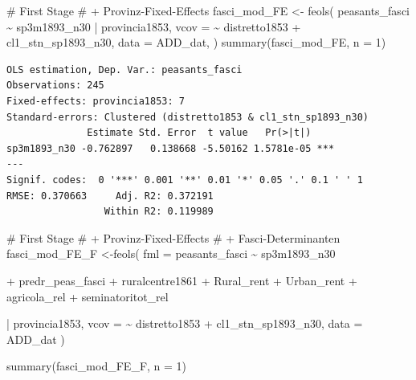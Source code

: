 \documentclass[
  a4paper,
  DIV=11,
  oneside]{scrreprt}
\newenvironment{Shaded}{\begin{snugshade}}{\end{snugshade}}
\newcommand{\AttributeTok}[1]{\textcolor[rgb]{0.40,0.45,0.13}{#1}}
\newcommand{\CommentTok}[1]{\textcolor[rgb]{0.37,0.37,0.37}{#1}}
\newcommand{\DecValTok}[1]{\textcolor[rgb]{0.68,0.00,0.00}{#1}}
\newcommand{\FunctionTok}[1]{\textcolor[rgb]{0.28,0.35,0.67}{#1}}
\newcommand{\NormalTok}[1]{\textcolor[rgb]{0.00,0.23,0.31}{#1}}
\newcommand{\OtherTok}[1]{\textcolor[rgb]{0.00,0.23,0.31}{#1}}
\newcommand{\SpecialCharTok}[1]{\textcolor[rgb]{0.37,0.37,0.37}{#1}}
\begin{document}
\begin{Shaded}
\begin{Highlighting}[]
\CommentTok{\# First Stage}
\CommentTok{\# + Provinz{-}Fixed{-}Effects}
\NormalTok{fasci\_mod\_FE }\OtherTok{\textless{}{-}} \FunctionTok{feols}\NormalTok{(}
\NormalTok{  peasants\_fasci }\SpecialCharTok{\textasciitilde{}} 
\NormalTok{    sp3m1893\_n30}
  \SpecialCharTok{|}\NormalTok{ provincia1853, }
  \AttributeTok{vcov =} \SpecialCharTok{\textasciitilde{}}\NormalTok{ distretto1853 }\SpecialCharTok{+}\NormalTok{ cl1\_stn\_sp1893\_n30,}
  \AttributeTok{data =}\NormalTok{ ADD\_dat,}
\NormalTok{  ) }
\FunctionTok{summary}\NormalTok{(fasci\_mod\_FE, }\AttributeTok{n =} \DecValTok{1}\NormalTok{)}
\end{Highlighting}
\end{Shaded}

\begin{verbatim}
OLS estimation, Dep. Var.: peasants_fasci
Observations: 245
Fixed-effects: provincia1853: 7
Standard-errors: Clustered (distretto1853 & cl1_stn_sp1893_n30) 
              Estimate Std. Error  t value   Pr(>|t|)    
sp3m1893_n30 -0.762897   0.138668 -5.50162 1.5781e-05 ***
---
Signif. codes:  0 '***' 0.001 '**' 0.01 '*' 0.05 '.' 0.1 ' ' 1
RMSE: 0.370663     Adj. R2: 0.372191
                 Within R2: 0.119989
\end{verbatim}

\begin{Shaded}
\begin{Highlighting}[]
\CommentTok{\# First Stage}
\CommentTok{\# + Provinz{-}Fixed{-}Effects}
\CommentTok{\# + Fasci{-}Determinanten}
\NormalTok{fasci\_mod\_FE\_F }\OtherTok{\textless{}{-}}\FunctionTok{feols}\NormalTok{(}
  \AttributeTok{fml =}\NormalTok{ peasants\_fasci }\SpecialCharTok{\textasciitilde{}} 
\NormalTok{    sp3m1893\_n30 }
  
  \SpecialCharTok{+}\NormalTok{ predr\_peas\_fasci}
  \SpecialCharTok{+}\NormalTok{ ruralcentre1861}
  \SpecialCharTok{+}\NormalTok{ Rural\_rent}
  \SpecialCharTok{+}\NormalTok{ Urban\_rent}
  \SpecialCharTok{+}\NormalTok{ agricola\_rel}
  \SpecialCharTok{+}\NormalTok{ seminatoritot\_rel}
  
  \SpecialCharTok{|}\NormalTok{ provincia1853, }
  \AttributeTok{vcov =} \SpecialCharTok{\textasciitilde{}}\NormalTok{ distretto1853 }\SpecialCharTok{+}\NormalTok{ cl1\_stn\_sp1893\_n30,}
  \AttributeTok{data =}\NormalTok{ ADD\_dat }
\NormalTok{  ) }

\FunctionTok{summary}\NormalTok{(fasci\_mod\_FE\_F, }\AttributeTok{n =} \DecValTok{1}\NormalTok{)}
\end{Highlighting}
\end{Shaded}
\end{document}
